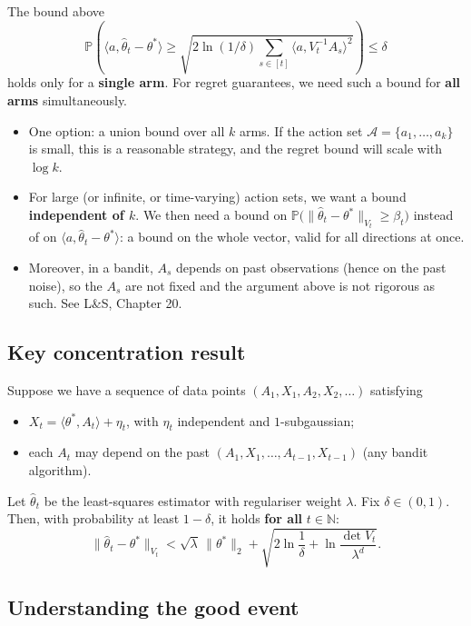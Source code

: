 The bound above
\[
\mathbb{P}\left(\big\langle a, \hat{\theta}_t - \theta^*\big\rangle \geq \sqrt{2\ln(1/\delta)\sum_{s\in[t]}\big\langle a, V_t^{-1}A_s\big\rangle^2}\right) \leq \delta
\]
holds only for a \textbf{single arm}. For regret guarantees, we need such a bound for \textbf{all arms} simultaneously.
\begin{itemize}
    \item One option: a union bound over all $k$ arms. If the action set $\mathcal{A} = \{a_1, \dots, a_k\}$ is small, this is a reasonable strategy, and the regret bound will scale with $\log k$.
    \item For large (or infinite, or time-varying) action sets, we want a bound \textbf{independent of $k$}. We then need a bound on $\mathbb{P}\big(\|\hat{\theta}_t - \theta^*\|_{V_t} \geq \beta_t\big)$ instead of on $\langle a, \hat{\theta}_t - \theta^*\rangle$: a bound on the whole vector, valid for all directions at once.
    \item Moreover, in a bandit, $A_s$ depends on past observations (hence on the past noise), so the $A_s$ are not fixed and the argument above is not rigorous as such. See L\&S, Chapter 20.
\end{itemize}

\subsection{Key concentration result}

\begin{theorem}
Suppose we have a sequence of data points $(A_1, X_1, A_2, X_2, \dots)$ satisfying
\begin{itemize}
    \item $X_t = \langle\theta^*, A_t\rangle + \eta_t$, with $\eta_t$ independent and $1$-subgaussian;
    \item each $A_t$ may depend on the past $(A_1, X_1, \dots, A_{t-1}, X_{t-1})$ (any bandit algorithm).
\end{itemize}
Let $\hat{\theta}_t$ be the least-squares estimator with regulariser weight $\lambda$. Fix $\delta \in (0,1)$. Then, with probability at least $1 - \delta$, it holds \textbf{for all} $t \in \mathbb{N}$:
\[
\big\|\hat{\theta}_t - \theta^*\big\|_{V_t} < \sqrt{\lambda}\,\|\theta^*\|_2 + \sqrt{2\ln\frac{1}{\delta} + \ln\frac{\det V_t}{\lambda^d}}.
\]
\end{theorem}

\subsection{Understanding the good event}

